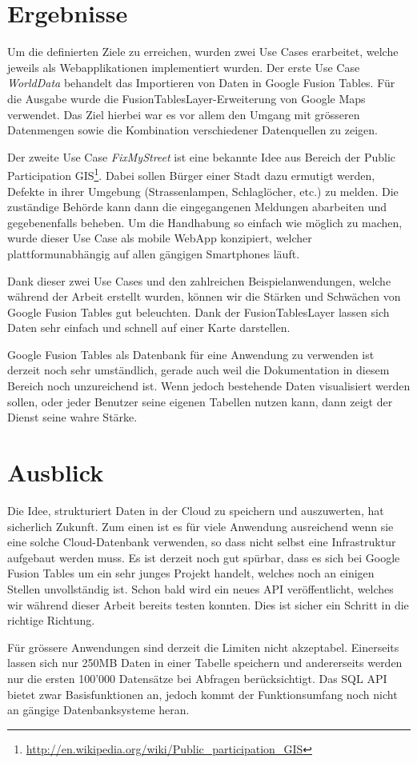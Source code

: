 \section*{Ergebnisse}
Um die definierten Ziele zu erreichen, wurden zwei Use Cases erarbeitet, welche jeweils als Webapplikationen implementiert wurden. Der erste Use Case \emph{WorldData} behandelt das Importieren von Daten in Google Fusion Tables. Für die Ausgabe wurde die FusionTablesLayer-Erweiterung von Google Maps verwendet. Das Ziel hierbei war es vor allem den Umgang mit grösseren Datenmengen sowie  die Kombination verschiedener Datenquellen zu zeigen.

Der zweite Use Case \emph{FixMyStreet} ist eine bekannte Idee aus Bereich der Public Participation \gls{GIS}\footnote{\url{http://en.wikipedia.org/wiki/Public_participation_GIS}}. Dabei sollen Bürger einer Stadt dazu ermutigt werden, Defekte in ihrer Umgebung (Strassenlampen, Schlaglöcher, etc.) zu melden. Die zuständige Behörde kann dann die eingegangenen Meldungen abarbeiten und gegebenenfalls beheben. Um die Handhabung so einfach wie möglich zu machen, wurde dieser Use Case als mobile \gls{WebApp} konzipiert, welcher plattformunabhängig auf allen gängigen Smartphones läuft.

Dank dieser zwei Use Cases und den zahlreichen Beispielanwendungen, welche während der Arbeit erstellt wurden, können wir die Stärken und Schwächen von Google Fusion Tables gut beleuchten. Dank der FusionTablesLayer lassen sich Daten sehr einfach und schnell auf einer Karte darstellen.

Google Fusion Tables als Datenbank für eine Anwendung zu verwenden ist derzeit noch sehr umständlich, gerade auch weil die Dokumentation in diesem Bereich noch unzureichend ist. Wenn jedoch bestehende Daten visualisiert werden sollen, oder jeder Benutzer seine eigenen Tabellen nutzen kann, dann zeigt der Dienst seine wahre Stärke.

\section*{Ausblick}
Die Idee, strukturiert Daten in der \gls{Cloud} zu speichern und auszuwerten, hat sicherlich Zukunft. Zum einen ist es für viele Anwendung ausreichend wenn sie eine solche \gls{Cloud}-Datenbank verwenden, so dass nicht selbst eine Infrastruktur aufgebaut werden muss. Es ist derzeit noch gut spürbar, dass es sich bei Google Fusion Tables um ein sehr junges Projekt handelt, welches noch an einigen Stellen unvollständig ist. Schon bald wird ein neues API veröffentlicht, welches wir während dieser Arbeit bereits testen konnten. Dies ist sicher ein Schritt in die richtige Richtung.

Für grössere Anwendungen sind derzeit die Limiten nicht akzeptabel. Einerseits lassen sich nur 250MB Daten in einer Tabelle speichern und andererseits werden nur die ersten 100'000 Datensätze bei Abfragen berücksichtigt. Das SQL API bietet zwar Basisfunktionen an, jedoch kommt der Funktionsumfang noch nicht an gängige Datenbanksysteme heran.